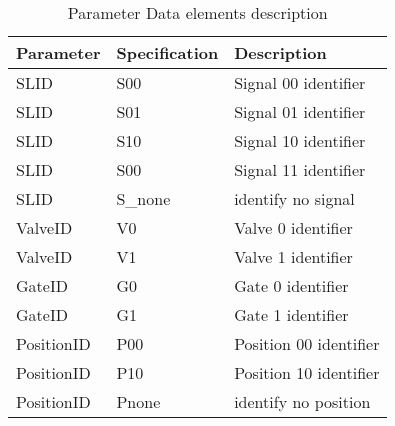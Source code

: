 \begin{table}[htbp]
	\centering
	\begin{tabular}{lll}
		\toprule
		\textbf{Parameter} & \textbf{Specification} & \textbf{Description} \\
		\hline
		SLID & S00 &  Signal 00 identifier\\
		SLID & S01 &  Signal 01 identifier\\
		SLID  & S10 &  Signal 10 identifier\\
		SLID  & S00 &  Signal 11 identifier\\
		SLID    & S\_none &  identify no signal\\
		ValveID & V0 &  Valve 0 identifier\\
		ValveID & V1 &  Valve 1 identifier\\
		GateID & G0 &  Gate 0 identifier\\
		GateID & G1 &  Gate 1 identifier\\
		PositionID & P00 &  Position 00 identifier\\
		PositionID & P10 &  Position 10 identifier\\
		PositionID   & Pnone &  identify no position\\
		\bottomrule
	\end{tabular}%
	\caption{Parameter Data elements description}
	\label{tab:ids}%
\end{table}%



